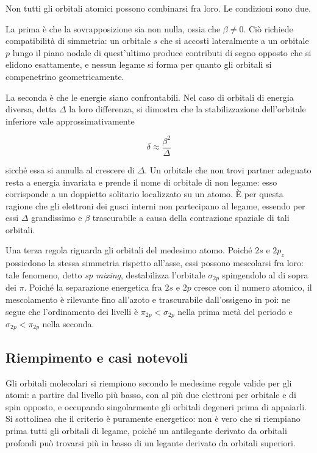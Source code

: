 Non tutti gli orbitali atomici possono combinarsi fra loro. Le condizioni sono due.

La prima è che la sovrapposizione sia non nulla, ossia che $\beta \neq 0$. Ciò richiede compatibilità di simmetria: un orbitale $s$ che si accosti lateralmente a un orbitale $p$ lungo il piano nodale di quest'ultimo produce contributi di segno opposto che si elidono esattamente, e nessun legame si forma per quanto gli orbitali si compenetrino geometricamente.

La seconda è che le energie siano confrontabili. Nel caso di orbitali di energia diversa, detta $\Delta$ la loro differenza, si dimostra che la stabilizzazione dell'orbitale inferiore vale approssimativamente

\begin{equation}
    \delta \approx \frac{\beta^2}{\Delta}
    \label{eq:criterio_energia}
\end{equation}

sicché essa si annulla al crescere di $\Delta$. Un orbitale che non trovi partner adeguato resta a energia invariata e prende il nome di orbitale di non legame: esso corrisponde a un doppietto solitario localizzato su un atomo. È per questa ragione che gli elettroni dei gusci interni non partecipano al legame, essendo per essi $\Delta$ grandissimo e $\beta$ trascurabile a causa della contrazione spaziale di tali orbitali.

Una terza regola riguarda gli orbitali del medesimo atomo. Poiché $2s$ e $2p_z$ possiedono la stessa simmetria rispetto all'asse, essi possono mescolarsi fra loro: tale fenomeno, detto \emph{sp mixing}, destabilizza l'orbitale $\sigma_{2p}$ spingendolo al di sopra dei $\pi$. Poiché la separazione energetica fra $2s$ e $2p$ cresce con il numero atomico, il mescolamento è rilevante fino all'azoto e trascurabile dall'ossigeno in poi: ne segue che l'ordinamento dei livelli è $\pi_{2p} < \sigma_{2p}$ nella prima metà del periodo e $\sigma_{2p} < \pi_{2p}$ nella seconda.

\subsection{Riempimento e casi notevoli}

Gli orbitali molecolari si riempiono secondo le medesime regole valide per gli atomi: a partire dal livello più basso, con al più due elettroni per orbitale e di spin opposto, e occupando singolarmente gli orbitali degeneri prima di appaiarli. Si sottolinea che il criterio è puramente energetico: non è vero che si riempiano prima tutti gli orbitali di legame, poiché un antilegante derivato da orbitali profondi può trovarsi più in basso di un legante derivato da orbitali superiori.\\


